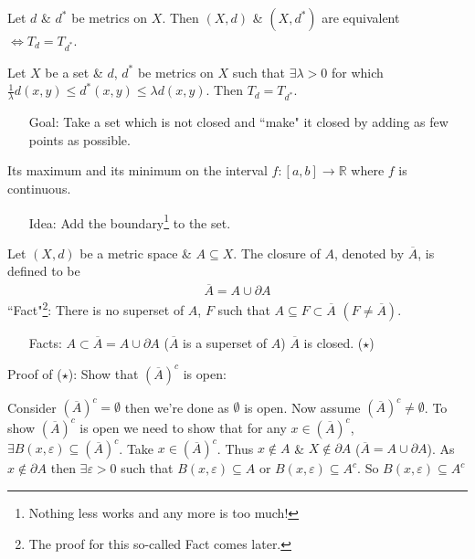 \documentclass[10pt]{article}
\begin{document}
Let $d$ \& $d^{*}$ be metrics on $X$. Then $(X,d)$ \& $(X,d^{*})$ are equivalent $\iff T_{d}=T_{d^{*}}$.

Let $X$ be a set \& $d$, $d^{*}$ be metrics on $X$ such that $\exists\lambda>0$ for which $\frac{1}{\lambda}d(x,y)\leq d^{*}(x,y)\leq\lambda d(x,y)$. Then $T_{d}=T_{d^{*}}$.
\begin{itemize}
    \item[Goal:] Take a set which is not closed and ``make" it closed by adding as few points as possible.
\end{itemize}
Its maximum and its minimum on the interval $f:[a,b]\to\mathbb{R}$ where $f$ is continuous.

\begin{center}
\end{center}
\begin{itemize}
    \item[Idea:] Add the boundary\footnote{Nothing less works and any more is too much!} to the set.
\end{itemize}
Let $(X,d)$ be a metric space \& $A\subseteq X$. The closure of $A$, denoted by $\overline{A}$, is defined to be
\begin{align*}
    \overline{A}=A\cup\partial A
\end{align*}
``Fact"\footnote{The proof for this so-called Fact comes later.}: There is no superset of $A$, $F$ such that $A\subseteq F\subset\overline{A}\,\,(F\neq\overline{A})$.
\begin{itemize}
    \item[Facts:] 
    \subitem $A\subset\overline{A}=A\cup\partial A$ ($\overline{A}$ is a superset of $A$)
    \subitem $\overline{A}$ is closed. ($\star$)
\end{itemize}
Proof of ($\star$): Show that $(\overline{A})^{c}$ is open:

Consider $(\overline{A})^{c}=\emptyset$ then we're done as $\emptyset$ is open. Now assume $(\overline{A})^{c}\neq\emptyset$. To show $(\overline{A})^{c}$ is open we need to show that for any $x\in(\overline{A})^{c}$, $\exists B(x,\varepsilon)\subseteq(\overline{A})^{c}$. Take $x\in(\overline{A})^{c}$. Thus $x\notin A$ \& $X\notin\partial A$ ($\overline{A}=A\cup\partial A$). As $x\notin\partial A$ then $\exists\varepsilon>0$ such that $B(x,\varepsilon)\subseteq A$ or $B(x,\varepsilon)\subseteq A^{c}$. So $B(x,\varepsilon)\subseteq A^{c}$
\end{document}

